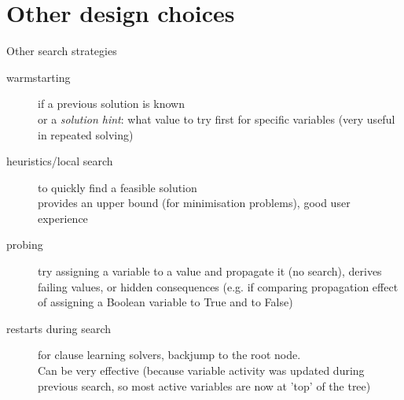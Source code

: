 \documentclass{cons-beamer}
\begin{document}
\section{Other design choices}

\begin{frame}{Other search strategies}
  \begin{description}
    \item[warmstarting] if a previous solution is known \\
    or a \textit{solution hint}: what value to try first for specific variables (very useful in repeated solving)

    \item[heuristics/local search] to quickly find a feasible solution\\
        provides an upper bound (for minimisation problems), good user experience

    \item[probing\hfill] try assigning a variable to a value and propagate it (no search), derives failing values, or hidden consequences (e.g. if comparing propagation effect of assigning a Boolean variable to True and to False)
    
    \item[restarts during search] for clause learning solvers, backjump to the root node.\\
    Can be very effective (because variable activity was updated during previous search, so most active variables are now at 'top' of the tree)
  \end{description}
\end{frame}
\end{document}
